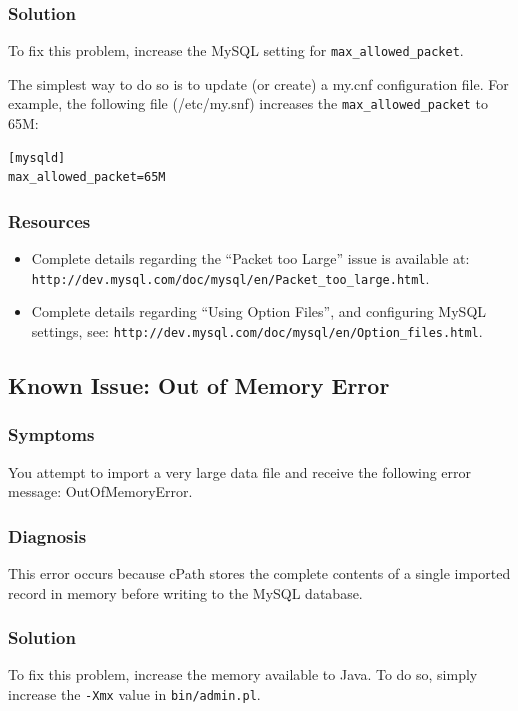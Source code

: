 \documentclass[letterpaper,12pt]{article}
\begin{document}
\subsubsection{Solution}
To fix this problem, increase the MySQL setting for \verb+max_allowed_packet+.

The simplest way to do so is to update (or create) a my.cnf configuration file.  For example, the following file (/etc/my.snf) increases the \verb+max_allowed_packet+ to 65M:

\begin{verbatim}
[mysqld]
max_allowed_packet=65M
\end{verbatim}

\subsubsection{Resources}

\begin{itemize}

\item Complete details regarding the ``Packet too Large'' issue is available at:  \verb+http://dev.mysql.com/doc/mysql/en/Packet_too_large.html+.

\item Complete details regarding “Using Option Files”, and configuring MySQL settings, see: \verb+http://dev.mysql.com/doc/mysql/en/Option_files.html+.

\end{itemize}

\subsection{Known Issue: Out of Memory Error}

\subsubsection{Symptoms}
You attempt to import a very large data file and receive the following error message: OutOfMemoryError.

\subsubsection{Diagnosis}
This error occurs because cPath stores the complete contents of a single imported record in memory before writing to the MySQL database.

\subsubsection{Solution}
To fix this problem, increase the memory available to Java.   To do so, simply increase the \verb+-Xmx+ value in \verb+bin/admin.pl+.
\end{document}
